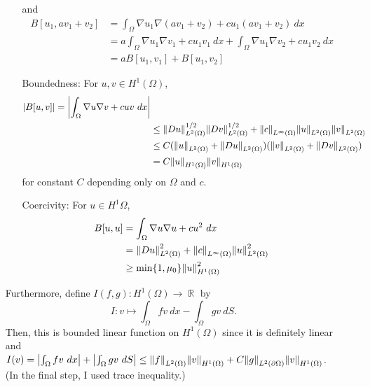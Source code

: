 \documentclass{article}
\DeclareMathOperator{\rr}{\mathbb{R}}
\begin{document}
\begin{enumerate}
\begin{enumerate}
and
\begin{equation*}
\begin{split}
B[u_1,av_1+v_2]&=\int_\Omega \nabla u_1 \nabla (av_1+v_2) + cu_1(av_1+v_2)~dx\\
&=a\int_\Omega \nabla u_1 \nabla v_1 + cu_1v_1~dx+\int_\Omega \nabla u_1 \nabla v_2 + cu_1v_2~dx\\
&=aB[u_1,v_1]+B[u_1,v_2]
\end{split}
\end{equation*}
\item[Boundedness:] For $u,v\in H^1(\Omega)$,
\begin{equation*}
\begin{split}
\abs{B[u,v]}=\abs{\int_\Omega \nabla u \nabla v + cuv~dx} \\
&\leq\norm{Du}^{1/2}_{L^2(\Omega)}\norm{Dv}^{1/2}_{L^2(\Omega)}+\norm{c}_{L^\infty(\Omega)}\norm{u}_{L^2(\Omega)}\norm{v}_{L^2(\Omega)}\\
&\leq C(\norm{u}_{L^2(\Omega)}+\norm{Du}_{L^2(\Omega)})(\norm{v}_{L^2(\Omega)}+\norm{Dv}_{L^2(\Omega)}) \\
&=C\norm{u}_{H^1(\Omega)}\norm{v}_{H^1(\Omega)}
\end{split}
\end{equation*}
for constant $C$ depending only on $\Omega$ and $c$.
\item[Coercivity:] For $u\in H^1{\Omega}$,
\begin{equation*}
\begin{split}
B[u,u]&=\int_\Omega \nabla u \nabla u + cu^2~dx \\
&=\norm{Du}^2_{L^2(\Omega)}+\norm{c}_{L^\infty(\Omega)}\norm{u}^2_{L^2(\Omega)}\\
&\geq \min\{1,\mu_0\}\norm{u}^2_{H^1(\Omega)}
\end{split}
\end{equation*}
\end{enumerate}
Furthermore, define $I(f,g):H^1(\Omega)\rightarrow \rr$ by
\begin{equation*}
I:v\mapsto \int_{\Omega} fv~dx-\int_{\Omega} gv~dS.
\end{equation*}
Then, this is bounded linear function on $H^1(\Omega)$ since it is definitely linear and $I(v)=\abs{\int_{\Omega} fv~dx}+\abs{\int_{\Omega} gv~dS}\leq \norm{f}_{L^2(\Omega)}\norm{v}_{H^1(\Omega)}+C\norm{g}_{L^2(\partial \Omega)}\norm{v}_{H^1(\Omega)}$. (In the final step, I used trace inequality.)


\end{enumerate}
\end{document}
